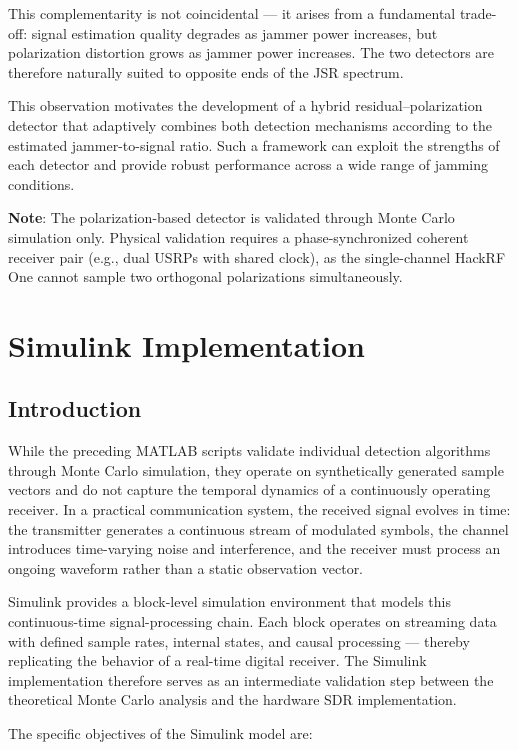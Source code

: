 \documentclass{article}
\begin{document}
This complementarity is not coincidental — it arises from a fundamental trade-off: signal estimation quality degrades as jammer power increases, but polarization distortion grows as jammer power increases. The two detectors are therefore naturally suited to opposite ends of the JSR spectrum.

This observation motivates the development of a hybrid
residual--polarization detector that adaptively combines both detection
mechanisms according to the estimated jammer-to-signal ratio. Such a
framework can exploit the strengths of each detector and provide robust
performance across a wide range of jamming conditions.

\textbf{Note}: The polarization-based detector is validated through Monte Carlo simulation only. Physical validation requires a phase-synchronized coherent receiver pair (e.g., dual USRPs with shared clock), as the single-channel HackRF One cannot sample two orthogonal polarizations simultaneously.


\section{Simulink Implementation}

\subsection{Introduction}

While the preceding MATLAB scripts validate individual detection algorithms through Monte Carlo simulation, they operate on synthetically generated sample vectors and do not capture the temporal dynamics of a continuously operating receiver. In a practical communication system, the received signal evolves in time: the transmitter generates a continuous stream of modulated symbols, the channel introduces time-varying noise and interference, and the receiver must process an ongoing waveform rather than a static observation vector.

Simulink provides a block-level simulation environment that models this continuous-time signal-processing chain. Each block operates on streaming data with defined sample rates, internal states, and causal processing — thereby replicating the behavior of a real-time digital receiver. The Simulink implementation therefore serves as an intermediate validation step between the theoretical Monte Carlo analysis and the hardware SDR implementation.

The specific objectives of the Simulink model are:
\end{document}
